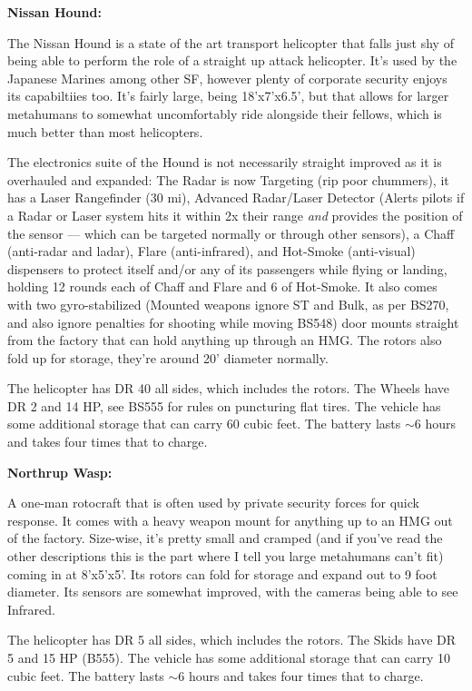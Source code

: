 \textbf{Nissan Hound:}

The Nissan Hound is a state of the art transport helicopter that falls just shy of being able to perform the role of a straight up attack helicopter. It's  used by the Japanese Marines among other SF, however plenty of corporate security enjoys its capabiltiies too. It's fairly large, being 18'x7'x6.5', but that allows for larger metahumans to somewhat uncomfortably ride alongside their fellows, which is much better than most helicopters. 

The electronics suite of the Hound is not necessarily straight improved as it is overhauled and expanded: The Radar is now Targeting (rip poor chummers), it has a Laser Rangefinder (30 mi), Advanced Radar/Laser Detector (Alerts pilots if a Radar or Laser system hits it within 2x their range \textit{and} provides the position of the sensor — which can be targeted normally or through other sensors), a Chaff (anti-radar and ladar), Flare (anti-infrared), and Hot-Smoke (anti-visual) dispensers to protect itself and/or any of its passengers while flying or landing, holding 12 rounds each of Chaff and Flare and 6 of Hot-Smoke. It also comes with two gyro-stabilized (Mounted weapons ignore ST and Bulk, as per BS270, and also ignore penalties for shooting while moving BS548) door mounts straight from the factory that can hold anything up through an HMG. The rotors also fold up for storage, they're around 20' diameter normally.

The helicopter has DR 40 all sides, which includes the rotors. The Wheels have DR 2 and 14 HP, see BS555 for rules on puncturing flat tires. The vehicle has some additional storage that can carry 60 cubic feet. The battery lasts $\sim$6 hours and takes four times that to charge.
 
\textbf{Northrup Wasp:}
 
 A one-man rotocraft that is often used by private security forces for quick response. It comes with a heavy weapon mount for anything up to an HMG out of the factory. Size-wise, it's pretty small and cramped (and if you've read the other descriptions this is the part where I tell you large metahumans can't fit) coming in at 8'x5'x5'. Its rotors can fold for storage and expand out to 9 foot diameter. Its sensors are somewhat improved, with the cameras being able to see Infrared.
 
 The helicopter has DR 5 all sides, which includes the rotors. The Skids have DR 5 and 15 HP (B555). The vehicle has some additional storage that can carry 10 cubic feet. The battery lasts $\sim$6 hours and takes four times that to charge.
 
